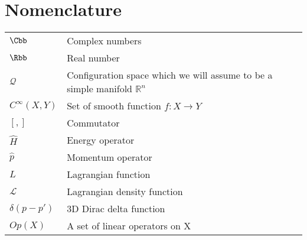 \chapter*{Nomenclature}

\begin{flushleft}
\begin{longtable}[l]{ll}
    $\Cbb$ & Complex numbers \\[1mm]
    $\Rbb$ & Real number \\[1mm]
    $\mathcal{Q}$ & Configuration space which we will assume to be a simple manifold $\mathbb{R}^{n}$ \\[1mm]
    $C^{\infty}(X, Y)$ & Set of smooth function $f: X \to Y$ \\[1mm]
    $[,]$ & Commutator \\[1mm]
    $\hat{H}$ & Energy operator \\[1mm]
    $\hat{p}$ & Momentum operator \\[1mm]
    $L$ & Lagrangian function \\[1mm]
    $\mathcal{L}$ & Lagrangian density function \\[1mm]
    $\delta(p - p')$ & 3D Dirac delta function \\[1mm]
    $Op(X)$ & A set of linear operators on X \\[1mm]
\end{longtable}
\end{flushleft}
